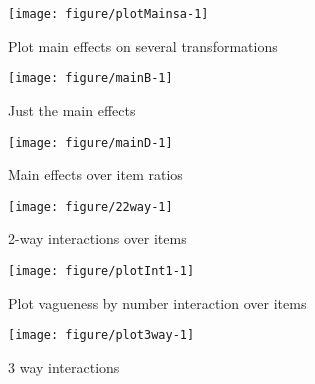 \documentclass[a4paper]{article}\usepackage[]{graphicx}\usepackage[]{color}
\makeatletter
\def\maxwidth{ %
  \ifdim\Gin@nat@width>\linewidth
    \linewidth
  \else
    \Gin@nat@width
  \fi
}
\newenvironment{knitrout}{}{} %
\makeatother
\begin{document}
\begin{knitrout}
\color{fgcolor}\begin{figure}
\texttt{[image: figure/plotMainsa-1]} \caption[Plot main effects on several transformations]{Plot main effects on several transformations}\label{fig:plotMainsa}
\end{figure}


\end{knitrout}

\begin{knitrout}
\color{fgcolor}\begin{figure}
\texttt{[image: figure/mainB-1]} \caption[Just the main effects]{Just the main effects}\label{fig:mainB}
\end{figure}


\end{knitrout}

\begin{knitrout}
\color{fgcolor}\begin{figure}
\texttt{[image: figure/mainD-1]} \caption[Main effects over item ratios]{Main effects over item ratios}\label{fig:mainD}
\end{figure}


\end{knitrout}

\begin{knitrout}
\color{fgcolor}\begin{figure}
\texttt{[image: figure/22way-1]} \caption[2-way interactions over items]{2-way interactions over items}\label{fig:22way}
\end{figure}


\end{knitrout}

\begin{knitrout}
\color{fgcolor}\begin{figure}
\texttt{[image: figure/plotInt1-1]} \caption[Plot vagueness by number interaction over items]{Plot vagueness by number interaction over items}\label{fig:plotInt1}
\end{figure}


\end{knitrout}

\begin{knitrout}
\color{fgcolor}\begin{figure}
\texttt{[image: figure/plot3way-1]} \caption[3 way interactions]{3 way interactions}\label{fig:plot3way}
\end{figure}


\end{knitrout}
\end{document}
